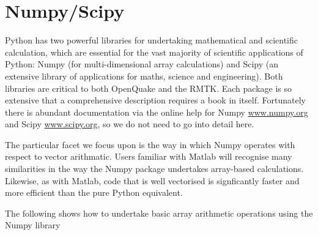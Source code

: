 

\section{Numpy/Scipy}

Python has two powerful libraries for undertaking mathematical and scientific calculation, which are essential for the vast majority of scientific applications of Python: Numpy (for multi-dimensional array calculations) and Scipy (an extensive library of applications for maths, science and engineering). Both libraries are critical to both OpenQuake and the RMTK. Each package is so extensive that a comprehensive description requires a book in itself. Fortunately there is abundant documentation via the online help for Numpy \href{www.numpy.org}{www.numpy.org} and Scipy \href{www.scipy.org}{www.scipy.org}, so we do not need to go into detail here.

The particular facet we focus upon is the way in which Numpy operates with respect to vector arithmatic. Users familiar with Matlab will recognise many similarities in the way the Numpy package undertakes array-based calculations. Likewise, as with Matlab, code that is well vectorised is signficantly faster and more efficient than the pure Python equivalent.

The following shows how to undertake basic array arithmetic operations using the Numpy library

